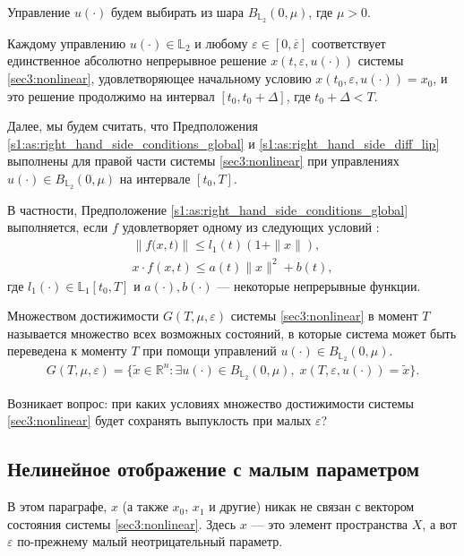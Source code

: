 \documentclass[../main.tex]{subfiles}
\begin{document}
Управление $ u(\cdot) $ будем выбирать из шара $ B_{\mathbb{L}_2}(0,\mu) $, где $ \mu > 0$.

Каждому управлению $u(\cdot) \in \mathbb{L}_2$ и любому $\varepsilon \in [0,\overline{\varepsilon}]$ соответствует единственное абсолютно непрерывное решение $ x(t,\varepsilon, u(\cdot)) $ системы \eqref{sec3:nonlinear}, удовлетворяющее начальному условию $ x(t_0,\varepsilon, u(\cdot)) = x_0$, и это решение продолжимо на интервал $[t_0, t_0 + \Delta]$, где $t_0 + \Delta < T$. 

Далее, мы будем считать, что Предположения \ref{s1:as:right_hand_side_conditions_global} и \ref{s1:as:right_hand_side_diff_lip} выполнены для правой части системы \eqref{sec3:nonlinear} при управлениях $ u(\cdot) \in B_{\mathbb{L}_2}(0,\mu) $ на интервале $ [t_0, T]$.

В частности, Предположение \ref{s1:as:right_hand_side_conditions_global} выполняется, если $f$ удовлетворяет одному из следующих условий \cite{Filippov2}:
\begin{gather}\label{sec3:sublinear_growth}
 \left\|f\big(x,t\big) \right\| \leqslant l_1(t) (1 + \|x\|), \\ 
 x \cdot f(x,t) \leqslant a(t) \|x\|^2 + b(t),
\end{gather}
где $l_1(\cdot) \in \mathbb{L}_1[t_0,T]$ и $a(\cdot), b(\cdot)$ --- некоторые непрерывные функции.

\begin{definition} 
 Множеством достижимости $G(T,\mu,\varepsilon) $ системы \eqref{sec3:nonlinear} в момент $T$ называется множество всех возможных состояний, в которые система может быть переведена к моменту $T$ при помощи управлений $ u(\cdot) \in B_{\mathbb{L}_2}(0,\mu) $.
 \begin{gather*}
 G(T,\mu,\varepsilon) =\{\widetilde{x}\in \mathbb{R}^n:\exists u(\cdot)\in B_{\mathbb{L}_2}(0,\mu),\; x(T,\varepsilon,u(\cdot)) = \widetilde{x}\}.
 \end{gather*}
\end{definition} 
Возникает вопрос: при каких условиях множество достижимости системы \eqref{sec3:nonlinear} будет сохранять выпуклость при малых $\varepsilon$?

\subsection{Нелинейное отображение с малым параметром}

В этом параграфе, $x$ (а также $x_0$, $x_1$ и другие) никак не связан с вектором состояния системы \eqref{sec3:nonlinear}.
Здесь $x$ --- это элемент пространства $X$, а вот $\varepsilon$ по-прежнему малый неотрицательный параметр.
\end{document}
